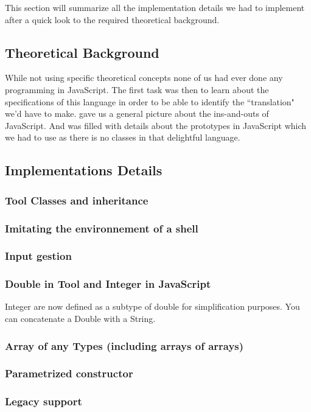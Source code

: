 This section will summarize all the implementation details we had to implement after a quick
look to the required theoretical background.

\subsection{Theoretical Background}
While not using specific theoretical concepts none of us had ever done any programming in JavaScript.
The first task was then to learn about the specifications of this language in order to be able to identify the ``translation" we'd have to make. \cite{JSGood} gave us a general picture about the ins-and-outs of JavaScript.
And \cite{JSProto} was filled with details about the prototypes in JavaScript which we had to use as there is no classes in that delightful language.

\subsection{Implementations Details}
\subsubsection{Tool Classes and inheritance}
\subsubsection{Imitating the environnement of a shell}
\subsubsection{Input gestion}
\subsubsection{Double in Tool and Integer in JavaScript}
Integer are now defined as a subtype of double for simplification purposes.
You can concatenate a Double with a String.
\subsubsection{Array of any Types (including arrays of arrays)}
\subsubsection{Parametrized constructor}
\subsubsection{Legacy support}



